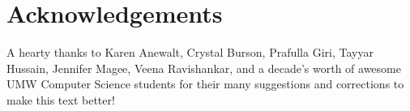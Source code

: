  
\chapter{Acknowledgements}

A hearty thanks to Karen Anewalt, Crystal Burson, Prafulla Giri, Tayyar
Hussain, Jennifer Magee, Veena Ravishankar, and a decade's worth of awesome UMW
Computer Science students for their many suggestions and corrections to make
this text better!
